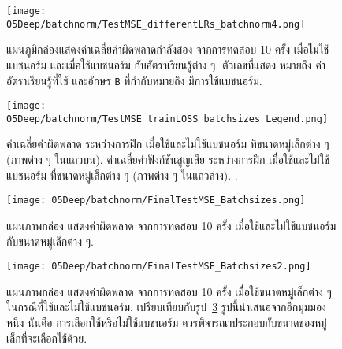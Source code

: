 \begin{Exercise}
\begin{figure}[H]
	\begin{center}	
	\texttt{[image: 05Deep/batchnorm/TestMSE\_differentLRs\_batchnorm4.png]}
	\end{center}		
\caption[ค่าผิดพลาดเมื่อไม่ใช้และใช้แบชนอร์ม
กับอัตราเรียนรู้ต่าง ๆ]{
แผนภูมิกล่องแสดงค่าเฉลี่ยค่าผิดพลาดกำลังสอง จากการทดสอบ 10 ครั้ง เมื่อไม่ใช้แบชนอร์ม
และเมื่อใช้แบชนอร์ม 
กับอัตราเรียนรู้ต่าง ๆ.
ตัวเลขที่แสดง หมายถึง ค่าอัตราเรียนรู้ที่ใช้
และอักษร \texttt{B} ที่กำกับหมายถึง มีการใช้แบชนอร์ม.}
	\label{fig: deep ex batchnorm diff LRs}
\end{figure}
%

\begin{figure}[H]
	\begin{center}	
		\texttt{[image: 05Deep/batchnorm/TestMSE\_trainLOSS\_batchsizes\_Legend.png]}
	\end{center}		
\caption[ค่าเฉลี่ยค่าผิดพลาด ระหว่างการฝึก เมื่อใช้และไม่ใช้แบชนอร์ม ที่ขนาดหมู่เล็กต่าง ๆ]{
ค่าเฉลี่ยค่าผิดพลาด ระหว่างการฝึก เมื่อใช้และไม่ใช้แบชนอร์ม ที่ขนาดหมู่เล็กต่าง ๆ (ภาพต่าง ๆ ในแถวบน).
ค่าเฉลี่ยค่าฟังก์ชันสูญเสีย ระหว่างการฝึก เมื่อใช้และไม่ใช้แบชนอร์ม ที่ขนาดหมู่เล็กต่าง ๆ (ภาพต่าง ๆ ในแถวล่าง).	
	.}
	\label{fig: deep ex batchnorm diff batch sizes}
\end{figure}
%

\begin{figure}[H]
	\begin{center}	
		\texttt{[image: 05Deep/batchnorm/FinalTestMSE\_Batchsizes.png]}
	\end{center}		
	\caption[แบชนอร์มและขนาดของหมู่เล็ก]{
		แผนภาพกล่อง แสดงค่าผิดพลาด จากการทดสอบ 10 ครั้ง เมื่อใช้และไม่ใช้แบชนอร์ม
		กับขนาดหมู่เล็กต่าง ๆ.}
	\label{fig: deep ex batchnorm diff batch sizes final test MSE}
\end{figure}
%

\begin{figure}[H]
	\begin{center}	
		\texttt{[image: 05Deep/batchnorm/FinalTestMSE\_Batchsizes2.png]}
	\end{center}		
	\caption[แบชนอร์มเปลี่ยนความสัมพันธ์ของการฝึกและขนาดหมู่เล็ก]{แผนภาพกล่อง แสดงค่าผิดพลาด จากการทดสอบ 10 ครั้ง เมื่อใช้ขนาดหมู่เล็กต่าง ๆ ในกรณีที่ใช้และไม่ใช้แบชนอร์ม.
	เปรียบเทียบกับรูป~\ref{fig: deep ex batchnorm diff batch sizes final test MSE} รูปนี้นำเสนอจากอีกมุมมองหนึ่ง นั่นคือ การเลือกใช้หรือไม่ใช้แบชนอร์ม ควรพิจารณาประกอบกับขนาดของหมู่เล็กที่จะเลือกใช้ด้วย.}
	\label{fig: deep ex batchnorm Batchsize}
\end{figure}
%


\end{Exercise}
